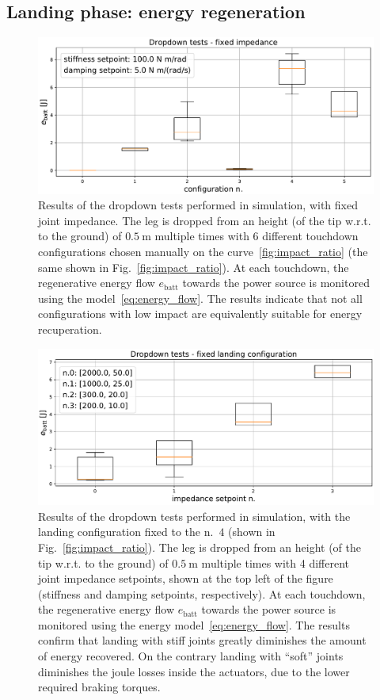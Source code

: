 \subsection{Landing phase: energy regeneration}\label{subsec:energy_reg}
\begin{figure}[t]
    \centering
    \includegraphics[width=1\columnwidth]{images/dropdown_const_imp.pdf}
    \caption{Results of the dropdown tests performed in simulation, with fixed joint impedance. The leg is dropped from an height (of the tip w.r.t. to the ground) of $0.5~\mathrm{m}$ multiple times with 6 different touchdown configurations chosen manually on the curve~\ref{fig:impact_ratio} (the same shown in Fig.~\ref{fig:impact_ratio}). At each touchdown, the regenerative energy flow $e_{\mathrm{batt}}$ towards the power source is monitored using the model~\eqref{eq:energy_flow}. The results indicate that not all configurations with low impact are equivalently suitable for energy recuperation.}
    \label{fig:fixed_imp_reg_energy}
\end{figure}
\begin{figure}[t]
    \centering
    \includegraphics[width=1\columnwidth]{images/dropdown_const_landing.pdf}
    \caption{Results of the dropdown tests performed in simulation, with the landing configuration fixed to the n.~$4$ (shown in Fig.~\ref{fig:impact_ratio}). The leg is dropped from an height (of the tip w.r.t. to the ground) of $0.5~\mathrm{m}$ multiple times with 4 different joint impedance setpoints, shown at the top left of the figure (stiffness and damping setpoints, respectively). At each touchdown, the regenerative energy flow $e_{\mathrm{batt}}$ towards the power source is monitored using the energy model~\eqref{eq:energy_flow}. The results confirm that landing with stiff joints greatly diminishes the amount of energy recovered. On the contrary landing with \enquote{soft} joints diminishes the joule losses inside the actuators, due to the lower required braking torques.}
    \label{fig:fixed_conf_reg_energy}
\end{figure}

